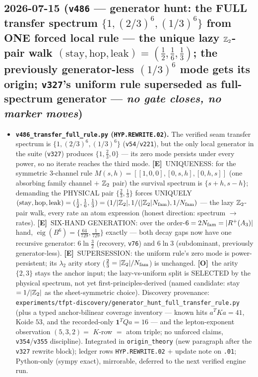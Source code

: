 \documentclass[11pt]{article}
\providecommand{\mE}{\textbf{[E]}}\providecommand{\mC}{\textbf{[C]}}
\providecommand{\mO}{\textbf{[O]}}\providecommand{\mX}{\textbf{[X]}}
\begin{document}
\subsection*{2026-07-15 (\texttt{v486} --- generator hunt: the FULL transfer spectrum $\{1,(2/3)^6,(1/3)^6\}$ from ONE forced local rule --- the unique lazy $\mathbb{Z}_2$-pair walk $(\mathrm{stay},\mathrm{hop},\mathrm{leak})=(\tfrac12,\tfrac16,\tfrac13)$; the previously generator-less $(1/3)^6$ mode gets its origin; \texttt{v327}'s uniform rule superseded as full-spectrum generator --- \emph{no gate closes, no marker moves})}
\begin{itemize}[leftmargin=1.5em]
\item \textbf{\texttt{v486\_transfer\_full\_rule.py} (\texttt{HYP.REWRITE.02}).} The verified seam
transfer spectrum is $\{1,(2/3)^6,(1/3)^6\}$ (\texttt{v54}/\texttt{v221}), but the only local generator
in the suite (\texttt{v327}) produces $\{1,\tfrac23,0\}$ --- its zero mode persists under every power, so
no iterate reaches the third mode. \mE\ UNIQUENESS: for the symmetric $3$-channel rule
$M(s,h)=[[1,0,0],[0,s,h],[0,h,s]]$ (one absorbing family channel $+$ $\mathbb{Z}_2$ pair) the survival spectrum
is $\{s{+}h,s{-}h\}$; demanding the PHYSICAL pair $\{\tfrac23,\tfrac13\}$ forces UNIQUELY
$(\mathrm{stay},\mathrm{hop},\mathrm{leak})=(\tfrac12,\tfrac16,\tfrac13)=(1/|\mathbb{Z}_2|,1/(|\mathbb{Z}_2|N_{\mathrm{fam}}),
1/N_{\mathrm{fam}})$ --- the lazy $\mathbb{Z}_2$-pair walk, every rate an atom expression (honest direction: spectrum $\to$
rates). \mE\ SIX-HAND GENERATION: over the order-$6=2N_{\mathrm{fam}}=|R^+(A_3)|$ hand,
$\operatorname{eig}(B^6)=\{\tfrac{64}{729},\tfrac1{729}\}$ exactly --- both decay gaps now have one
recursive generator: $6\ln\tfrac32$ (recovery, \texttt{v76}) and $6\ln3$ (subdominant, previously
generator-less). \mE\ SUPERSESSION: the uniform rule's zero mode is power-persistent; its $\lambda_2$
arity story ($\tfrac23=|\mathbb{Z}_2|/N_{\mathrm{fam}}$) is unchanged. \mO\ the arity $\{2,3\}$ stays the anchor input; the
lazy-vs-uniform split is SELECTED by the physical spectrum, not yet first-principles-derived (named
candidate: stay $=1/|\mathbb{Z}_2|$ as the sheet-symmetric choice). Discovery provenance:
\texttt{experiments/tfpt-discovery/generator\_hunt\_full\_transfer\_rule.py} (plus a typed
anchor-bilinear coverage inventory --- known hits $a^TKa{=}41$, Koide $53$, and the recorded-only
$\mathbf1^TQa{=}16$ --- and the lepton-exponent observation $(5,3,2)=$ $K$-row $=$ atom triple; no
unforced claims, \texttt{v354}/\texttt{v355} discipline). Integrated in \texttt{origin\_theory} (new
paragraph after the \texttt{v327} rewrite block); ledger rows \texttt{HYP.REWRITE.02} $+$ update note on
\texttt{.01}; Python-only (sympy exact), mirrorable, deferred to the next verified engine run.
\end{itemize}
\end{document}
